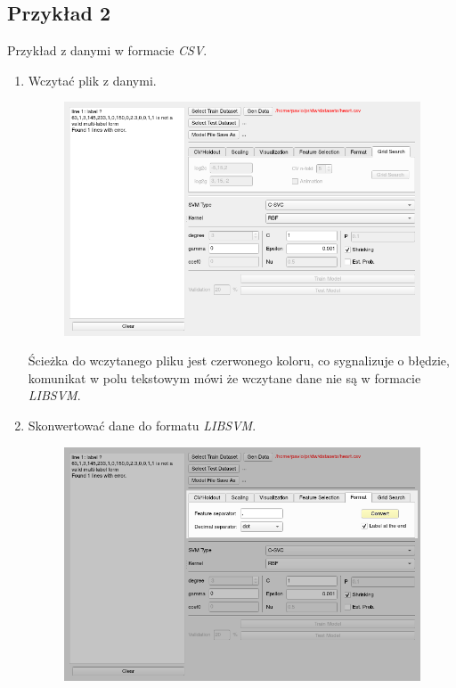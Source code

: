 \documentclass[paper=a4, fontsize=11pt]{scrartcl} %
\numberwithin{equation}{section} %
\numberwithin{figure}{section} %
\begin{document}
\newpage
\subsection{Przykład 2}
    \par Przykład z danymi w formacie \textit{CSV}. 
\begin{enumerate}[label={\textbf{Krok \theenumi :}},leftmargin=*]

    \item Wczytać plik z danymi.
    \begin{figure}[H]
        \begin{center}
            \includegraphics[scale=0.7]{./img/ex2_st1.png}
        \end{center}
    \end{figure}

    Ścieżka do wczytanego pliku jest czerwonego koloru, co sygnalizuje o błędzie, komunikat w
    polu tekstowym mówi że wczytane dane nie są w formacie \textit{LIBSVM}.

    \item Skonwertować dane do formatu \textit{LIBSVM}.

    \begin{figure}[H]
        \begin{center}
            \includegraphics[scale=0.7]{./img/ex2_st2.png}
        \end{center}
    \end{figure}


\end{enumerate}
\end{document}
